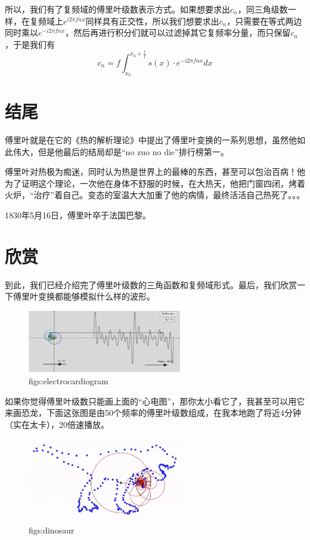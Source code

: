 \documentclass[lang=cn,11pt,a4paper,cite=numbers]{elegantpaper}
\begin{document}
所以，我们有了复频域的傅里叶级数表示方式。如果想要求出$c_{n}$，同三角级数一样，在复频域上$e^{i2{\pi}fnx}$同样具有正交性，所以我们想要求出$c_{n}$，只需要在等式两边同时乘以$e^{-i2{\pi}fnx}$，然后再进行积分们就可以过滤掉其它复频率分量，而只保留$c_{n}$，于是我们有
\begin{equation}
  c_{n}=f\int_{x_{0}}^{x_{0}+\frac{1}{f}}s(x){\cdot}e^{-i2{\pi}fnx}dx
\end{equation}

\section{结尾}
  傅里叶就是在它的《热的解析理论》中提出了傅里叶变换的一系列思想，虽然他如此伟大，但是他最后的结局却是“no zuo no die”排行榜第一。

  傅里叶对热极为痴迷，同时认为热是世界上的最棒的东西，甚至可以包治百病！他为了证明这个理论，一次他在身体不舒服的时候，在大热天，他把门窗四闭，烤着火炉，“治疗”着自己。变态的室温大大加重了他的病情，最终活活自己热死了。。。

  1830年5月16日，傅里叶卒于法国巴黎。

\section{欣赏}
  到此，我们已经介绍完了傅里叶级数的三角函数和复频域形式。最后，我们欣赏一下傅里叶变换都能够模拟什么样的波形。
\begin{figure}[!htb]
  \centering
  \includegraphics[width=0.6\textwidth]{figs/electrocardiogram.png}
  \caption{figs:electrocardiogram}
  \label{figs:electrocardiogram}
\end{figure}

  如果你觉得傅里叶级数只能画上面的“心电图”，那你太小看它了，我甚至可以用它来画恐龙，下面这张图是由50个频率的傅里叶级数组成，在我本地跑了将近4分钟（实在太卡），20倍速播放。
\begin{figure}[!htb]
  \centering
  \includegraphics[width=0.6\textwidth]{figs/dinosaur.png}
  \caption{figs:dinosaur}
  \label{figs:dinosaur}
\end{figure}
\end{document}
